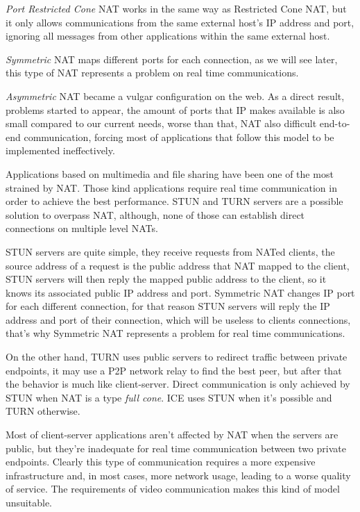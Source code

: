 \emph{Port Restricted Cone} \ac{NAT} works in the same way as Restricted Cone \ac{NAT}, but it only allows communications from the same external host's IP address and port, ignoring all messages from other applications within the same external host.

\emph{Symmetric} NAT maps different ports for each connection, as we will see later, this type of \ac{NAT} represents a problem on real time communications.

\emph{Asymmetric} \ac{NAT} became a vulgar configuration on the web. As a direct result, problems started to appear, the amount of ports that \ac{IP} makes available is also small compared to our current needs, worse than that, \ac{NAT} also difficult end-to-end communication, forcing most of applications that follow this model to be implemented ineffectively.

Applications based on multimedia and file sharing have been one of the most strained by \ac{NAT}. Those kind applications require real time communication in order to achieve the best performance. \ac{STUN} and \ac{TURN} \cite{natvoip} servers are a possible solution to overpass \ac{NAT}, although, none of those can establish direct connections on multiple level \ac{NAT}s.

\ac{STUN} servers are quite simple, they receive requests from \ac{NAT}ed clients, the source address of a request is the public address that \ac{NAT} mapped to the client, \ac{STUN} servers will then reply the mapped public address to the client, so it knows its associated public \ac{IP} address and port. Symmetric \ac{NAT} changes \ac{IP} port for each different connection, for that reason \ac{STUN} servers will reply the \ac{IP} address and port of their connection, which will be useless to clients connections, that's why Symmetric \ac{NAT} represents a problem for real time communications.   

On the other hand, \ac{TURN} uses public servers to redirect traffic between private endpoints, it may use a \ac{P2P} network relay to find the best peer, but after that the behavior is much like client-server. Direct communication is only achieved by \ac{STUN} when \ac{NAT} is a type \emph{full cone}. \ac{ICE} uses \ac{STUN} when it's possible and \ac{TURN} otherwise.

Most of client-server applications aren't affected by \ac{NAT} when the servers are public, but they're inadequate for real time communication between two private endpoints. Clearly this type of communication requires a more expensive infrastructure and, in most cases, more network usage, leading to a worse quality of service. The requirements of video communication makes this kind of model unsuitable.

